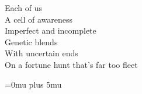 \documentclass[twoside,frontopenright,halfspacing, openany]{ip3thesis}
\begin{document}
\begin{epigraph*}

Each of us\\
A cell of awareness\\
Imperfect and incomplete\\
Genetic blends\\
With uncertain ends\\
On a fortune hunt that's far too fleet

\end{epigraph*}








%


\appendix

%
%
%

\Urlmuskip=0mu plus 5mu\relax


\end{document}
